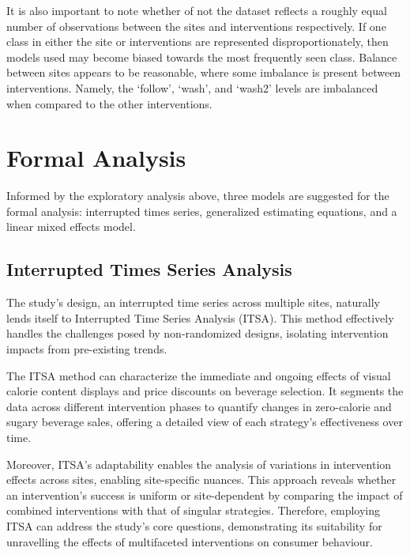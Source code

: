 \documentclass[
]{article}
\begin{document}
It is also important to note whether of not the dataset reflects a roughly equal number of observations between the sites and interventions respectively. If one class in either the site or interventions are represented disproportionately, then models used may become biased towards the most frequently seen class. Balance between sites appears to be reasonable, where some imbalance is present between interventions. Namely, the `follow', `wash', and `wash2' levels are imbalanced when compared to the other interventions.

\hypertarget{formal-analysis}{%
\section{Formal Analysis}\label{formal-analysis}}

Informed by the exploratory analysis above, three models are suggested for the formal analysis: interrupted times series, generalized estimating equations, and a linear mixed effects model.

\hypertarget{interrupted-times-series-analysis}{%
\subsection{Interrupted Times Series Analysis}\label{interrupted-times-series-analysis}}

The study's design, an interrupted time series across multiple sites, naturally lends itself to Interrupted Time Series Analysis (ITSA). This method effectively handles the challenges posed by non-randomized designs, isolating intervention impacts from pre-existing trends.

The ITSA method can characterize the immediate and ongoing effects of visual calorie content displays and price discounts on beverage selection. It segments the data across different intervention phases to quantify changes in zero-calorie and sugary beverage sales, offering a detailed view of each strategy's effectiveness over time.

Moreover, ITSA's adaptability enables the analysis of variations in intervention effects across sites, enabling site-specific nuances. This approach reveals whether an intervention's success is uniform or site-dependent by comparing the impact of combined interventions with that of singular strategies. Therefore, employing ITSA can address the study's core questions, demonstrating its suitability for unravelling the effects of multifaceted interventions on consumer behaviour.
\end{document}
